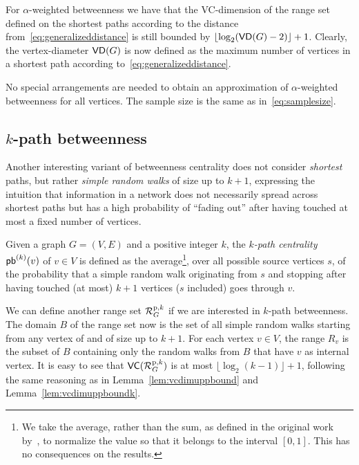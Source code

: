 For $\alpha$-weighted betweenness we have that the VC-dimension of the range set
defined on the shortest paths according to the distance
from~\eqref{eq:generalizeddistance} is still bounded by
$\lfloor\log_2(\mathsf{VD}(G)-2)\rfloor+1$. Clearly, the vertex-diameter $\mathsf{VD}(G)$ is now
defined as the maximum number of vertices in a shortest path according
to~\eqref{eq:generalizeddistance}.

No special arrangements are needed to obtain an approximation of
$\alpha$-weighted betweenness for all vertices. The sample size is the same as in~\eqref{eq:samplesize}.

\subsection{$k$-path betweenness}
Another interesting variant of betweenness centrality does not consider
\emph{shortest} paths, but rather \emph{simple random walks} of size up to
$k+1$, expressing the intuition that information in a network does not
necessarily spread across shortest paths but has a high probability of ``fading
out'' after having touched at most a fixed number of vertices.

\begin{definition}\label{def:kpathbetweenness}
 Given a graph $G=(V,E)$ and a positive integer $k$, the \emph{$k$-path
 centrality} $\mathsf{pb}^{(k)}(v)$ of $v\in V$ is defined as the average\footnote{We take the
 average, rather than the sum, as defined in the original work
 by~\citet{KourtellisASIT12}, to normalize the value so that it belongs to the interval
 $[0,1]$. This has no consequences on the results.}, over all possible source
 vertices $s$, of the probability that a simple random walk originating from
 $s$ and stopping after having touched (at most) $k+1$ vertices ($s$
 included) goes through $v$.
\end{definition}

We can define another range set $\mathcal{R}_G^{\mathrm{p},k}$ if we are interested
in $k$-path betweenness. The domain $B$ of the range set now is the set of all
simple random walks starting from any vertex of and of size up to $k+1$. For
each vertex $v\in V$, the range $R_v$ is the subset of $B$ containing only the
random walks from $B$ that have $v$ as internal vertex. It is easy to
see that $\mathsf{VC}(\mathcal{R}_G^{\mathrm{p},k})$ is at most
$\lfloor\log_2(k-1)\rfloor+1$, 
following the same reasoning as in Lemma~\ref{lem:vcdimuppbound} and
Lemma~\ref{lem:vcdimuppboundk}.

